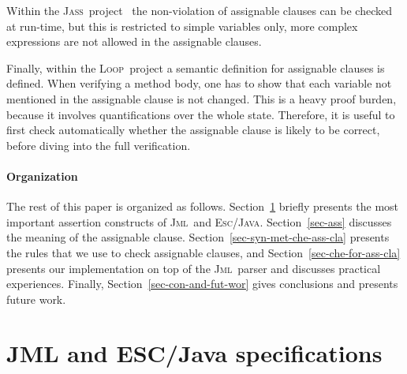 \documentclass[a4paper]{llncs}
\newcommand{\jml}{\textsc{Jml}}
\newcommand{\escj}{\textsc{Esc/Java}}
\newcommand{\jass}{\textsc{Jass}}
\newcommand{\loopp}{\textsc{Loop}}
\newcommand{\java}{\textsc{Java}}
\newcommand{\csrc}{\textsc{Compaq Src}}
\begin{document}
Within the \jass\ project~\cite{JassUrl} the non-violation of assignable
clauses can be checked at run-time, but this is restricted to simple
variables only, more complex expressions are not allowed in the
assignable clauses.

Finally, within the \loopp\ project a semantic definition for
assignable clauses is defined. When verifying a method body, one has
to show that each variable not mentioned in the assignable clause is
not changed. This is a heavy proof burden, because it involves
quantifications over the whole state. Therefore, it is useful to first 
check automatically whether the assignable clause is likely to be
correct, before diving into the full verification.

\paragraph{\bf{Organization}}

The rest of this paper is organized as follows.
Section~\ref{sec-esc-prg} briefly presents the most important
assertion constructs of \jml\ and \escj. Section~\ref{sec-ass}
discusses the meaning of the assignable clause.
Section~\ref{sec-syn-met-che-ass-cla} presents the rules that we use
to check assignable clauses, and Section~\ref{sec-che-for-ass-cla}
presents our implementation on top of the \jml\ parser and discusses
practical experiences.  Finally, Section~\ref{sec-con-and-fut-wor}
gives conclusions and presents future work.






\section{JML and ESC/Java specifications}
\label{sec-esc-prg}
\end{document}
